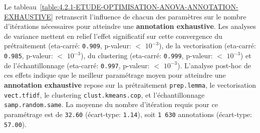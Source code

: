 			Le tableau~\ref{table:4.2.1-ETUDE-OPTIMISATION-ANOVA-ANNOTATION-EXHAUSTIVE} retranscrit l'influence de chacun des paramètres sur le nombre d'itérations nécessaires pour atteindre une \textbf{annotation exhaustive}.
			Les analyses de variance mettent en relief l'effet significatif sur cette convergence du prétraitement (eta-carré: \texttt{0.909}, p-valeur: \(<\) \texttt{\(10^{-3}\)}), de la vectorisation (eta-carré: \texttt{0.985}, p-valeur: \(<\) \texttt{\(10^{-3}\)}), du clustering (eta-carré: \texttt{0.999}, p-valeur: \(<\) \texttt{\(10^{-3}\)}) et de l'échantillonnage (eta-carré: \texttt{0.997}, p-valeur: \(<\) \texttt{\(10^{-3}\)}).
			L'analyse post-hoc de ces effets indique que le meilleur paramétrage moyen pour atteindre une \textbf{annotation exhaustive} repose sur la prétraitement \texttt{prep.lemma}, le vectorisation \texttt{vect.tfidf}, le clustering \texttt{clust.kmeans.cop}, et l'échantillonnage \texttt{samp.random.same}. La moyenne du nombre d'itération requis pour ce paramétrage est de \texttt{32.60} (écart-type: \texttt{1.14}), soit \texttt{1 630} annotations (écart-type: \texttt{57.00}).
